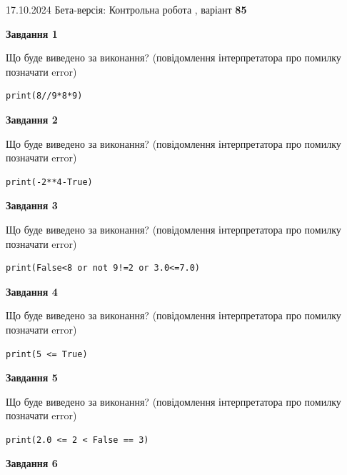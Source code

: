 \documentclass[12pt, ukrainian]{article}
\begin{document}
{\Large{17.10.2024 Бета-версія: Контрольна робота , варіант  \No \textbf { 85 }\par}}
{
\begin {large}
{\begin {center}\textbf{Завдання 1}\end {center}}

Що буде виведено за виконання? (повідомлення інтерпретатора про помилку позначати error)\par
\begin{verbatim}
print(8//9*8*9)
\end{verbatim}

{\begin {center}\textbf{Завдання 2}\end {center}}

Що буде виведено за виконання? (повідомлення інтерпретатора про помилку позначати error)\par
\begin{verbatim}
print(-2**4-True)
\end{verbatim}

{\begin {center}\textbf{Завдання 3}\end {center}}

Що буде виведено за виконання? (повідомлення інтерпретатора про помилку позначати error)\par
\begin{verbatim}
print(False<8 or not 9!=2 or 3.0<=7.0)
\end{verbatim}

{\begin {center}\textbf{Завдання 4}\end {center}}

Що буде виведено за виконання? (повідомлення інтерпретатора про помилку позначати error)\par
\begin{verbatim}
print(5 <= True)
\end{verbatim}

{\begin {center}\textbf{Завдання 5}\end {center}}

Що буде виведено за виконання? (повідомлення інтерпретатора про помилку позначати error)\par
\begin{verbatim}
print(2.0 <= 2 < False == 3)
\end{verbatim}

{\begin {center}\textbf{Завдання 6}\end {center}}


\end{large}}
\end{document}
